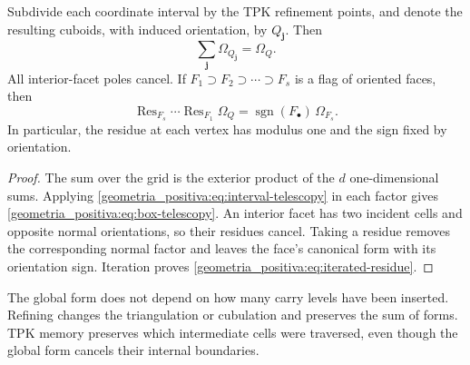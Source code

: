 \begin{theorem}
\label{geometria_positiva:thm:tpk-higher-residues} Subdivide each coordinate interval by the TPK refinement points, and denote the resulting cuboids, with induced orientation, by \(Q_{\mathbf j}\). Then
\begin{equation}
 \boxed{\displaystyle
 \sum_{\mathbf j}\Omega_{Q_{\mathbf j}}=\Omega_Q.}
 \label{geometria_positiva:eq:box-telescopy}
\end{equation}
All interior-facet poles cancel. If \(F_1\supset F_2\supset\cdots\supset F_s\) is a flag of oriented faces, then
\begin{equation}
 \operatorname{Res}_{F_s}\cdots\operatorname{Res}_{F_1}\Omega_Q
 =\operatorname{sgn}(F_\bullet)\,\Omega_{F_s}.
 \label{geometria_positiva:eq:iterated-residue}
\end{equation}
In particular, the residue at each vertex has modulus one and the sign fixed by orientation.
\end{theorem}
\begin{proof}
The sum over the grid is the exterior product of the \(d\) one-dimensional sums. Applying \eqref{geometria_positiva:eq:interval-telescopy} in each factor gives \eqref{geometria_positiva:eq:box-telescopy}. An interior facet has two incident cells and opposite normal orientations, so their residues cancel. Taking a residue removes the corresponding normal factor and leaves the face's canonical form with its orientation sign. Iteration proves \eqref{geometria_positiva:eq:iterated-residue}.
\end{proof}

\begin{corollary}
The global form does not depend on how many carry levels have been inserted. Refining changes the triangulation or cubulation and preserves the sum of forms. TPK memory preserves which intermediate cells were traversed, even though the global form cancels their internal boundaries.
\end{corollary}


